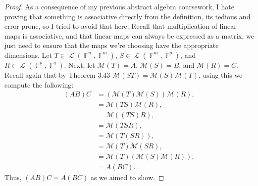 \documentclass[letterpaper, 12pt]{amsart}
\DeclareMathOperator{\F}{\mathbb{F}}				%
\DeclareMathOperator{\Ell}{\mathscr{L}}				%
\theoremstyle{definition}  							%
\begin{document}
		\begin{proof}
		As a consequence of my previous abstract algebra coursework, I hate proving that something is associative directly from the definition, its tedious and error-prone, so I tried to avoid that here.
		Recall that multiplication of linear maps is associative, and that linear maps can always be expressed as a matrix, we just need to ensure that the maps we're choosing have the appropriate dimensions.
		Let $T \in \Ell(\F^n,\F^m)$, $S \in \Ell(\F^m,\F^p)$, and $R \in \Ell(\F^p,\F^q)$.
		Next, let $\mathcal{M}(T) = A$, $\mathcal{M}(S) = B$, and $\mathcal{M}(R) = C$.
		Recall again that by Theorem 3.43 $\mathcal{M}(ST) = \mathcal{M}(S)\mathcal{M}(T)$, using this we compute the following:
			\begin{align*}
			(AB)C &= (\mathcal{M}(T)\mathcal{M}(S))\mathcal{M}(R), \\
			&= \mathcal{M}(TS)\mathcal{M}(R), \\
			&= \mathcal{M}((TS)R), \\
			&= \mathcal{M}(TSR), \\
			&= \mathcal{M}(T(SR)), \\
			&= \mathcal{M}(T)\mathcal{M}(SR), \\
			&= \mathcal{M}(T)(\mathcal{M}(S)\mathcal{M}(R)), \\
			&= A(BC).
			\end{align*}
		Thus, $(AB)C = A(BC)$ as we aimed to show.
			
		\end{proof}
\end{document}
